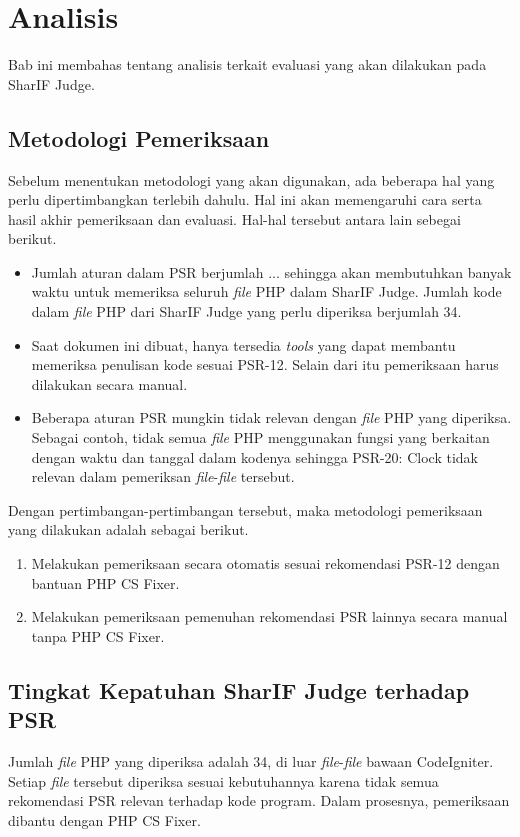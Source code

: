 \chapter{Analisis}
\label{chap:analisis}
Bab ini membahas tentang analisis terkait evaluasi yang akan dilakukan pada SharIF Judge. 


\section{Metodologi Pemeriksaan}
\label{sec:metodologi}

Sebelum menentukan metodologi yang akan digunakan, ada beberapa hal yang perlu dipertimbangkan terlebih dahulu. Hal ini akan memengaruhi cara serta hasil akhir pemeriksaan dan evaluasi. Hal-hal tersebut antara lain sebegai berikut.
\begin{itemize}
	\item Jumlah aturan dalam PSR berjumlah ... sehingga akan membutuhkan banyak waktu untuk memeriksa seluruh \textit{file} PHP dalam SharIF Judge. Jumlah kode dalam \textit{file} PHP dari SharIF Judge yang perlu diperiksa berjumlah 34.
	\item Saat dokumen ini dibuat, hanya tersedia \textit{tools} yang dapat membantu memeriksa penulisan kode sesuai PSR-12. Selain dari itu pemeriksaan harus dilakukan secara manual.
	\item Beberapa aturan PSR mungkin tidak relevan dengan \textit{file} PHP yang diperiksa. Sebagai contoh, tidak semua \textit{file} PHP menggunakan fungsi yang berkaitan dengan waktu dan tanggal dalam kodenya sehingga PSR-20: Clock tidak relevan dalam pemeriksan \textit{file}-\textit{file} tersebut.
\end{itemize} 
Dengan pertimbangan-pertimbangan tersebut, maka metodologi pemeriksaan yang dilakukan adalah sebagai berikut.
\begin{enumerate}
	\item Melakukan pemeriksaan secara otomatis sesuai rekomendasi PSR-12 dengan bantuan PHP CS Fixer.
	\item Melakukan pemeriksaan pemenuhan rekomendasi PSR lainnya secara manual tanpa PHP CS Fixer. 
\end{enumerate}


\section{Tingkat Kepatuhan SharIF Judge terhadap PSR}
\label{sec:tingkat_patuh}
Jumlah \textit{file} PHP yang diperiksa adalah 34, di luar \textit{file}-\textit{file} bawaan CodeIgniter. Setiap \textit{file} tersebut diperiksa sesuai kebutuhannya karena tidak semua rekomendasi PSR relevan terhadap kode program. Dalam prosesnya, pemeriksaan dibantu dengan PHP CS Fixer. 

